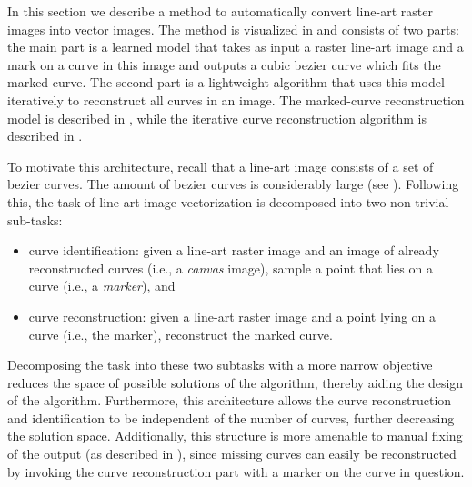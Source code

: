 In this section we describe a method to automatically convert line-art raster images into vector images. The method is visualized in  and consists of two parts: the main part is a learned model that takes as input a raster line-art image and a mark on a curve in this image and outputs a cubic bezier curve which fits the marked curve. The second part is a lightweight algorithm that uses this model iteratively to reconstruct all curves in an image. The marked-curve reconstruction model is described in , while the iterative curve reconstruction algorithm is described in .

To motivate this architecture, recall that a line-art image consists of a set of bezier curves. The amount of bezier curves is considerably large (see ). Following this, the task of line-art image vectorization is decomposed into two non-trivial sub-tasks:
%
\begin{itemize}
    \item curve identification: given a line-art raster image and an image of already reconstructed curves (i.e., a \textit{canvas} image), sample a point that lies on a curve (i.e., a \textit{marker}), and
    \item curve reconstruction: given a line-art raster image and a point lying on a curve (i.e., the marker), reconstruct the marked curve.
\end{itemize}
%
Decomposing the task into these two subtasks with a more narrow objective reduces the space of possible solutions of the algorithm, thereby aiding the design of the algorithm. Furthermore, this architecture allows the curve reconstruction and identification to be independent of the number of curves, further decreasing the solution space. Additionally, this structure is more amenable to manual fixing of the output (as described in ), since missing curves can easily be reconstructed by invoking the curve reconstruction part with a marker on the curve in question.

